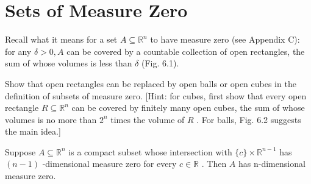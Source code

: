 

\section{Sets of Measure Zero}

\begin{definition}
\label{def:6-38-extra-1}
\mathlibok
Recall what it means for a set $A \subseteq  {\mathbb{R}}^{n}$ to have measure zero (see Appendix C): for any $\delta  > 0, A$ can be covered by a countable collection of open rectangles, the sum of whose volumes is less than $\delta$ (Fig. 6.1).
\end{definition}

\begin{exercise}
\label{exer:6-1}
\leanok
{}
Show that open rectangles can be replaced by open balls or open cubes in the definition of subsets of measure zero. [Hint: for cubes, first show that every open rectangle $R \subseteq  {\mathbb{R}}^{n}$ can be covered by finitely many open cubes, the sum of whose volumes is no more than ${2}^{n}$ times the volume of $R$ . For balls, Fig. 6.2 suggests the main idea.]
\end{exercise}

\begin{lemma}
\label{lem:6-2}
\leanok
{}
Suppose $A \subseteq  {\mathbb{R}}^{n}$ is a compact subset whose intersection with $\{ c\}  \times  {\mathbb{R}}^{n - 1}$ has $\left( {n - 1}\right)$ -dimensional measure zero for every $c \in  \mathbb{R}$ . Then $A$ has n-dimensional measure zero.
\end{lemma}

